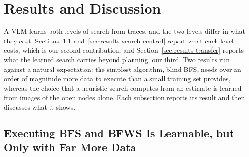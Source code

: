 \section{Results and Discussion}
\label{sec:results}
\label{sec:discussion}

A VLM learns both levels of search from traces, and the two levels differ in what they cost. Sections~\ref{sec:results-data-cost} and~\ref{sec:results-search-control} report what each level costs, which is our second contribution, and Section~\ref{sec:results-transfer} reports what the learned search carries beyond planning, our third. Two results run against a natural expectation: the simplest algorithm, blind BFS, needs over an order of magnitude more data to execute than a small training set provides, whereas the choice that a heuristic search computes from an estimate is learned from images of the open nodes alone. Each subsection reports its result and then discusses what it shows.

\subsection{Executing BFS and BFWS Is Learnable, but Only with Far More Data}
\label{sec:results-data-cost}

